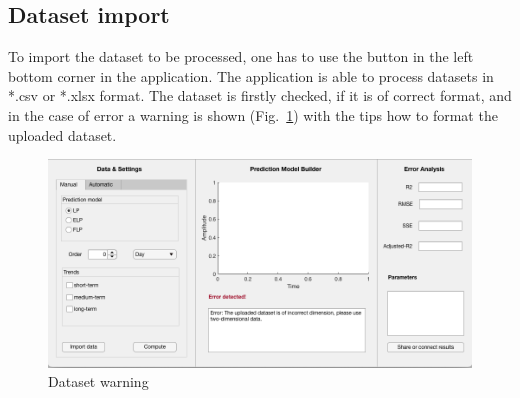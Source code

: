 

        \subsection{Dataset import}
 
       To import the dataset to be processed, one has to use the button in the left
        bottom corner in the application. The application is able to
        process datasets in *.csv or *.xlsx format. The dataset is firstly checked, if it is of correct format, and in the case of error a warning is shown (Fig.~\ref{fig:warning}) with the tips
        how to format the uploaded dataset.
               \begin{figure}[h!]
        \centering
            \includegraphics[width=\textwidth]{figures/warning.png}
            \caption{Dataset warning}
            \label{fig:warning}
    \end{figure}

